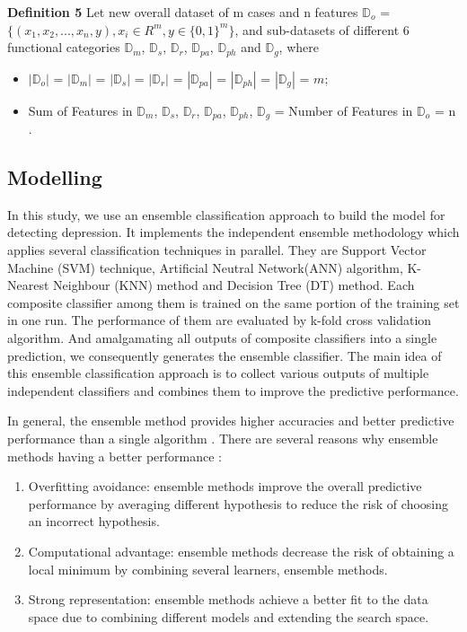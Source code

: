 \documentclass[10pt,journal,compsoc]{IEEEtran}
\begin{document}
\textbf{Definition 5} Let new overall dataset of m cases and n features $\mathbb{D}_{o}$ = $\displaystyle \big\{ (x_{1}, x_{2}, ... , x_{n}, y ), x_{i} \in R^{m}, y \in {\{0, 1\}}^{m}  \big\}$, and sub-datasets of different 6 functional categories $\mathbb{D}_{m}$, $\mathbb{D}_{s}$, $\mathbb{D}_{r}$, $\mathbb{D}_{pa}$, $\mathbb{D}_{ph}$ and $\mathbb{D}_{g}$, where
\begin{itemize}
  \item $|\mathbb{D}_{o}|$ = $|\mathbb{D}_{m}|$ = $|\mathbb{D}_{s}|$ = $|\mathbb{D}_{r}|$ = $|\mathbb{D}_{pa}|$ = $|\mathbb{D}_{ph}|$ = $|\mathbb{D}_{g}|$ = $m$;
  \item Sum of Features in $\mathbb{D}_{m}$, $\mathbb{D}_{s}$, $\mathbb{D}_{r}$, $\mathbb{D}_{pa}$, $\mathbb{D}_{ph}$, $\mathbb{D}_{g}$ = Number of Features in $\mathbb{D}_{o}$ = n .
\end{itemize}
%
%
\subsection{Modelling}
In this study, we use an ensemble classification approach to build the model for detecting depression. It implements the independent ensemble methodology which applies several classification techniques in parallel. They are Support Vector Machine (SVM) technique, Artificial Neutral Network(ANN) algorithm, K-Nearest Neighbour (KNN) method and Decision Tree (DT) method. Each composite classifier among them is trained on the same portion of the training set in one run. The performance of them are evaluated by k-fold cross validation algorithm. And amalgamating all outputs of composite classifiers into a single prediction, we consequently generates the ensemble classifier. The main idea of this ensemble classification approach is to collect various outputs of multiple independent classifiers and combines them to improve the predictive performance. 

In general, the ensemble method provides higher accuracies and better predictive performance than a single algorithm \cite{Rokach}. There are several reasons why ensemble methods having a better performance \cite{Sagi}: 
\renewcommand\labelitemii{$\square$}
\begin{enumerate}[label=(\roman*)]
  \item Overfitting avoidance: ensemble methods improve the overall predictive performance by averaging different hypothesis to reduce the risk of choosing an incorrect hypothesis.  
  \item \vspace{3mm} Computational advantage: ensemble methods decrease the risk of obtaining a local minimum by combining several learners, ensemble methods.
  \item \vspace{3mm}Strong representation: ensemble methods achieve a better fit to the data space due to combining different models and extending the search space. 
\end{enumerate}
\end{document}
